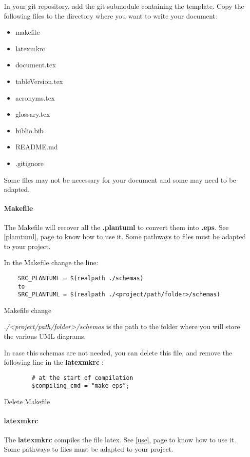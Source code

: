 In your git repository, add the git submodule containing the template.
Copy the following files to the directory where you want to write your document:
\begin{itemize}
    \item makefile
    \item latexmkrc
    \item document.tex
    \item tableVersion.tex
    \item acronyms.tex
    \item glossary.tex
    \item biblio.bib
    \item README.md
    \item .gitignore
\end{itemize}

Some files may not be necessary for your document and some may need to be adapted.

\paragraph{Makefile}
The Makefile will recover all the \textbf{.plantuml} to convert them into \textbf{.eps}. See
\ref{plamtuml}, page \pageref{plamtuml} to know how to use it.
Some pathways to files must be adapted to your project.

In the Makefile change the line:
\begin{code}
    \begin{verbatim}
    SRC_PLANTUML = $(realpath ./schemas)
    to
    SRC_PLANTUML = $(realpath ./<project/path/folder>/schemas)
\end{verbatim}
    \caption{Makefile change}
\end{code}

\emph{./<project/path/folder>/schemas} is the path to the folder where you will store the various
UML diagrams.\newline

In case this schemas are not needed, you can delete this file, and remove the following line in the
\textbf{latexmkrc} :
\begin{code}
    \begin{verbatim}
        # at the start of compilation
        $compiling_cmd = "make eps";
    \end{verbatim}
    \caption{Delete Makefile}
\end{code}


\paragraph{latexmkrc}
The \textbf{latexmkrc} compiles the file \gls{latex}. See \ref{use}, page \pageref{use} to know how
to use it.
Some pathways to files must be adapted to your project.

